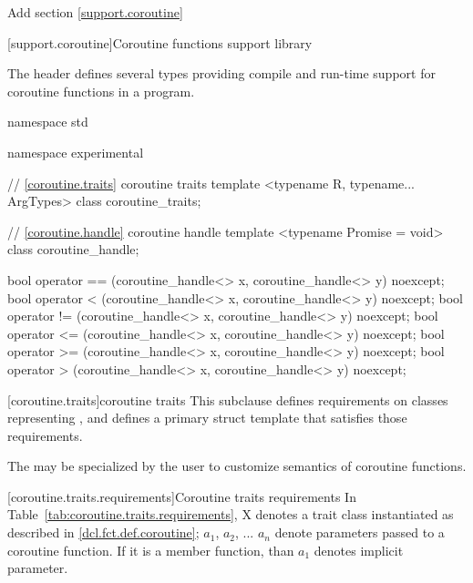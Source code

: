 Add section \ref{support.coroutine}

\setcounter{section}{10}
[support.coroutine]{Coroutine functions support library}

\pnum
The header
defines several types providing compile and run-time support for coroutine functions in a \Cpp program.


%
%
\begin{codeblock}
namespace std {
namespace experimental {
  // \ref{coroutine.traits} coroutine traits
  template <typename R, typename... ArgTypes>
    class coroutine_traits;
	
  // \ref{coroutine.handle} coroutine handle
  template <typename Promise = void>
    class coroutine_handle;		
	
  bool operator == (coroutine_handle<> x, coroutine_handle<> y) noexcept;
  bool operator < (coroutine_handle<> x, coroutine_handle<> y) noexcept;			
  bool operator != (coroutine_handle<> x, coroutine_handle<> y) noexcept;
  bool operator <= (coroutine_handle<> x, coroutine_handle<> y) noexcept;			
  bool operator >= (coroutine_handle<> x, coroutine_handle<> y) noexcept;
  bool operator > (coroutine_handle<> x, coroutine_handle<> y) noexcept;			
}
}
\end{codeblock}

[coroutine.traits]{coroutine traits}
\pnum
This subclause defines requirements on classes representing
,
and defines a primary struct template
that satisfies those requirements.


\pnum
The  may be specialized by the user 
to customize semantics of coroutine functions.

[coroutine.traits.requirements]{Coroutine traits requirements}
\pnum
In Table~\ref{tab:coroutine.traits.requirements}, X denotes 
a trait class instantiated as described in \ref{dcl.fct.def.coroutine};
$a_1$, $a_2$, ... $a_n$ denote parameters passed to a coroutine function. If it is a member function, than $a_1$ denotes implicit  parameter.

